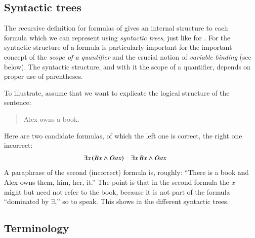 \documentclass[nobib,nofonts]{tufte-handout}
\newcommand{\proplog}{\acro{PropLog}}
\newcommand{\predlog}{\acro{PredLog}}
\begin{document}
\subsection{Syntactic trees}

The recursive definition for formulas of \predlog gives an internal structure to each formula which we can represent using \emph{syntactic trees}, just like for \proplog.
For \predlog the syntactic structure of a formula is particularly important for the important concept of the \emph{scope of a quantifier} and the crucial notion of \emph{variable binding} (see below).
The syntactic structure, and with it the scope of a quantifier, depends on proper use of parentheses.

To illustrate, assume that we want to explicate the logical structure of the sentence:
\begin{quote}
  Alex owns a book.
\end{quote}
Here are two candidate formulas, of which the left one is correct, the right one incorrect:
\begin{align*}
 & \exists x \thinspace (Bx \wedge Oax) && \exists x \thinspace Bx \wedge Oax
\end{align*}
A paraphrase of the second (incorrect) formula is, roughly: ``There is a book and Alex owns them, him, her, it.''
The point is that in the second formula the $x$ might but need not refer to the book, because it is not part of the formula ``dominated by \(\exists\),'' so to speak.
This shows in the different syntactic trees.

\begin{center}
  \hfill
\end{center}

\subsection{Terminology}
\end{document}
